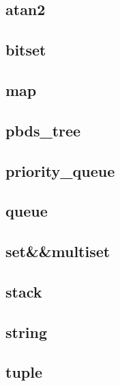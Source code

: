 \documentclass[11pt,a4paper]{ctexart}
\begin{document}
\subsection{atan2}


\subsection{bitset}


\subsection{map}


\subsection{pbds\_tree}


\subsection{priority\_queue}


\subsection{queue}


\subsection{set\&\&multiset}


\subsection{stack}


\subsection{string}


\subsection{tuple}

\end{document}
